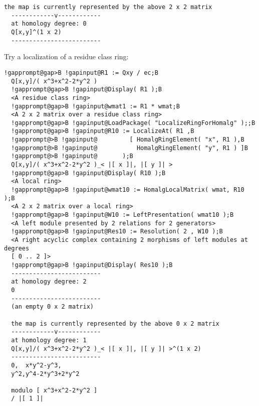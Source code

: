\documentclass[a4paper,11pt]{report}
\begin{document}
{{\begin{Verbatim}[commandchars=!@|,fontsize=\small,frame=single,label=Example]
  the map is currently represented by the above 2 x 2 matrix
  ------------v------------
  at homology degree: 0
  Q[x,y]^(1 x 2)
  -------------------------
\end{Verbatim}
 Try a localization of a residue class ring: 
\begin{Verbatim}[commandchars=!@B,fontsize=\small,frame=single,label=Example]
  !gapprompt@gap>B !gapinput@R1 := Qxy / ec;B
  Q[x,y]/( x^3+x^2-2*y^2 )
  !gapprompt@gap>B !gapinput@Display( R1 );B
  <A residue class ring>
  !gapprompt@gap>B !gapinput@wmat1 := R1 * wmat;B
  <A 2 x 2 matrix over a residue class ring>
  !gapprompt@gap>B !gapinput@LoadPackage( "LocalizeRingForHomalg" );;B
  !gapprompt@gap>B !gapinput@R10 := LocalizeAt( R1 ,B
  !gapprompt@>B !gapinput@         [ HomalgRingElement( "x", R1 ),B
  !gapprompt@>B !gapinput@           HomalgRingElement( "y", R1 ) ]B
  !gapprompt@>B !gapinput@       );B
  Q[x,y]/( x^3+x^2-2*y^2 )_< |[ x ]|, |[ y ]| >
  !gapprompt@gap>B !gapinput@Display( R10 );B
  <A local ring>
  !gapprompt@gap>B !gapinput@wmat10 := HomalgLocalMatrix( wmat, R10 );B
  <A 2 x 2 matrix over a local ring>
  !gapprompt@gap>B !gapinput@W10 := LeftPresentation( wmat10 );B
  <A left module presented by 2 relations for 2 generators>
  !gapprompt@gap>B !gapinput@Res10 := Resolution( 2 , W10 );B
  <A right acyclic complex containing 2 morphisms of left modules at degrees
  [ 0 .. 2 ]>
  !gapprompt@gap>B !gapinput@Display( Res10 );B
  -------------------------
  at homology degree: 2
  0
  -------------------------
  (an empty 0 x 2 matrix)
  
  the map is currently represented by the above 0 x 2 matrix
  ------------v------------
  at homology degree: 1
  Q[x,y]/( x^3+x^2-2*y^2 )_< |[ x ]|, |[ y ]| >^(1 x 2)
  -------------------------
  0,  x*y^2-y^3,
  y^2,y^4-2*y^3+2*y^2
  
  modulo [ x^3+x^2-2*y^2 ]
  / |[ 1 ]|
  

\end{Verbatim}}}
\end{document}
